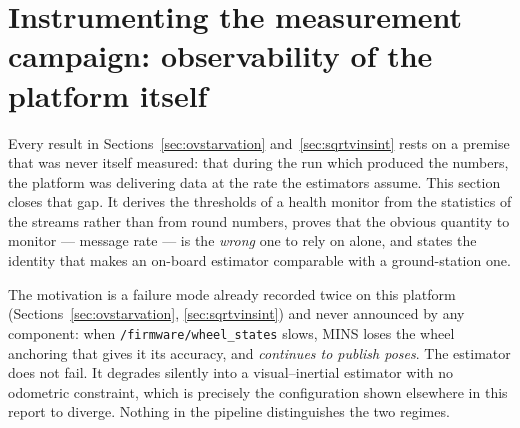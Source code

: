 \section{Instrumenting the measurement campaign: observability of the
platform itself}
\label{sec:campagne}

Every result in Sections~\ref{sec:ovstarvation} and~\ref{sec:sqrtvinsint} rests on
a premise that was never itself measured: that during the run which produced
the numbers, the platform was delivering data at the rate the estimators
assume. This section closes that gap. It derives the thresholds of a
health monitor from the statistics of the streams rather than from round
numbers, proves that the obvious quantity to monitor --- message rate --- is
the \emph{wrong} one to rely on alone, and states the identity that makes an
on-board estimator comparable with a ground-station one.

The motivation is a failure mode already recorded twice on this platform
(Sections~\ref{sec:ovstarvation}, \ref{sec:sqrtvinsint}) and never announced by
any component: when \texttt{/firmware/wheel\_states} slows, MINS loses the
wheel anchoring that gives it its accuracy, and \emph{continues to publish
poses}. The estimator does not fail. It degrades silently into a
visual--inertial estimator with no odometric constraint, which is precisely
the configuration shown elsewhere in this report to diverge. Nothing in the
pipeline distinguishes the two regimes.


